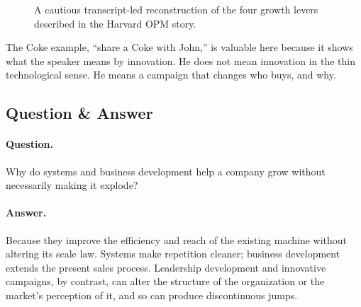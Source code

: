 \begin{figure}[h]
\centering
{}
\caption{A cautious transcript-led reconstruction of the four growth levers described in the Harvard OPM story.}
\end{figure}

The Coke example, ``share a Coke with John,'' is valuable here because it shows what the speaker means by innovation. He does not mean innovation in the thin technological sense. He means a campaign that changes who buys, and why.

\subsection{Question \& Answer}

\paragraph{Question.} Why do systems and business development help a company grow without necessarily making it explode?

\paragraph{Answer.} Because they improve the efficiency and reach of the existing machine without altering its scale law. Systems make repetition cleaner; business development extends the present sales process. Leadership development and innovative campaigns, by contrast, can alter the structure of the organization or the market's perception of it, and so can produce discontinuous jumps.

